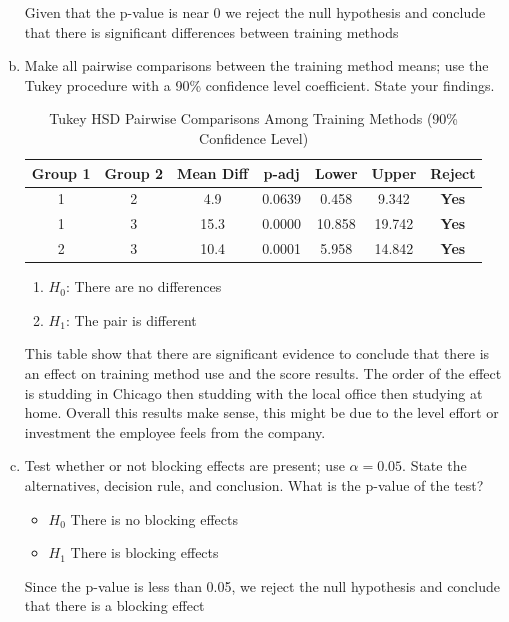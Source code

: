 \documentclass{article}
\begin{document}
\begin{enumerate}[(a)]
	      Given that the p-value is near 0 we reject the null hypothesis and conclude that there is significant differences between training methods
	\item Make all pairwise comparisons between the training method means; use the Tukey procedure with a 90\% confidence level coefficient. State your findings.
	      \begin{table}[htbp]
		      \centering
		      \caption{Tukey HSD Pairwise Comparisons Among Training Methods (90\% Confidence Level)}
		      \begin{tabular}{ccccccc}
			      \toprule
			      \textbf{Group 1} & \textbf{Group 2} & \textbf{Mean Diff} & \textbf{p-adj} & \textbf{Lower} & \textbf{Upper} & \textbf{Reject} \\
			      \midrule
			      1                & 2                & 4.9                & 0.0639         & 0.458          & 9.342          & \textbf{Yes}    \\
			      1                & 3                & 15.3               & 0.0000         & 10.858         & 19.742         & \textbf{Yes}    \\
			      2                & 3                & 10.4               & 0.0001         & 5.958          & 14.842         & \textbf{Yes}    \\
			      \bottomrule
		      \end{tabular}
	      \end{table}
	      \begin{enumerate}
		      \item $H_0$: There are no differences
		      \item $H_1$: The pair is different
	      \end{enumerate}
	      This table show that there are significant evidence to conclude that there is an effect on training method use and the score results. The order of the effect is
	      studding in Chicago then studding with the local office then studying at home. Overall this results make sense, this might be due to the level effort or investment the employee feels from the company.

	\item Test whether or not blocking effects are present; use \( \alpha = 0.05 \). State the alternatives, decision rule, and conclusion. What is the p-value of the test?
	      \begin{itemize}
		      \item \(H_0\) There is no blocking effects
		      \item \(H_1\) There is blocking effects
	      \end{itemize}


	      Since the p-value is less than 0.05, we reject the null hypothesis and conclude that there is a blocking effect

\end{enumerate}
\end{document}
